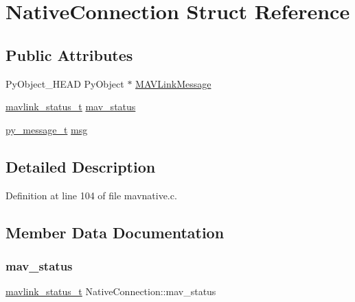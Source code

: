 \hypertarget{structNativeConnection}{}\section{Native\+Connection Struct Reference}
\label{structNativeConnection}
\subsection*{Public Attributes}
\begin{DoxyCompactItemize}
\item 
Py\+Object\+\_\+\+H\+E\+AD Py\+Object $\ast$ \mbox{\hyperlink{structNativeConnection_a6e972be69603d3a7c4a733476aaa5879}{M\+A\+V\+Link\+Message}}
\item 
\mbox{\hyperlink{include__v0_89_2mavlink__types_8h_aec6f7af3879252822d8fb108e97aafc2}{mavlink\+\_\+status\+\_\+t}} \mbox{\hyperlink{structNativeConnection_a8e3e37ebe9d5bddafac97584e6b848ba}{mav\+\_\+status}}
\item 
\mbox{\hyperlink{structpy__message__t}{py\+\_\+message\+\_\+t}} \mbox{\hyperlink{structNativeConnection_a593cfa273b85b9065e6699b46507cf98}{msg}}
\end{DoxyCompactItemize}


\subsection{Detailed Description}


Definition at line 104 of file mavnative.\+c.



\subsection{Member Data Documentation}
\mbox{\label{structNativeConnection_a8e3e37ebe9d5bddafac97584e6b848ba}} 
\subsubsection{\texorpdfstring{mav\_status}{mav\_status}}
{\footnotesize\ttfamily \mbox{\hyperlink{include__v0_89_2mavlink__types_8h_aec6f7af3879252822d8fb108e97aafc2}{mavlink\+\_\+status\+\_\+t}} Native\+Connection\+::mav\+\_\+status}



